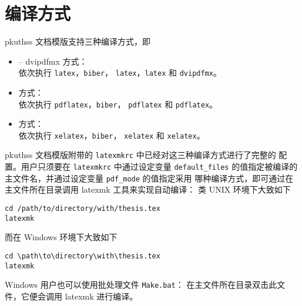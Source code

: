\section{编译方式}\label{sec:compile}

pkuthss 文档模版支持三种编译方式，即
\begin{itemize}
  \item {} -- dvipdfmx 方式：\\
    依次执行 \verb|latex|，\verb|biber|，%
    \verb|latex|，\verb|latex| 和 \verb|dvipdfmx|。
  \item {} 方式：\\
    依次执行 \verb|pdflatex|，\verb|biber|，%
    \verb|pdflatex| 和 \verb|pdflatex|。
  \item {} 方式：\\
    依次执行 \verb|xelatex|，\verb|biber|，%
    \verb|xelatex| 和 \verb|xelatex|。
\end{itemize}

pkuthss 文档模版附带的 \verb|latexmkrc| 中已经对这三种编译方式进行了完整的
配置。用户只须要在 \verb|latexmkrc| 中通过设定变量 \verb|default_files|
的值指定被编译的主文件名，并通过设定变量 \verb|pdf_mode| 的值指定采用
哪种编译方式，即可通过在主文件所在目录调用 latexmk 工具来实现自动编译：
类 UNIX 环境下大致如下
\begin{Verbatim}
cd /path/to/directory/with/thesis.tex
latexmk
\end{Verbatim}
而在 Windows 环境下大致如下
\begin{Verbatim}
cd \path\to\directory\with\thesis.tex
latexmk
\end{Verbatim}

Windows 用户也可以使用批处理文件 \verb|Make.bat|：
在主文件所在目录双击此文件，它便会调用 latexmk 进行编译。
